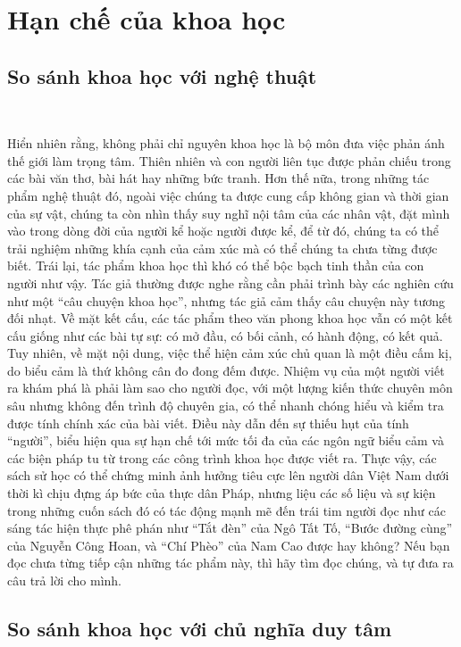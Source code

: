 \section{Hạn chế của khoa học}

\subsection{So sánh khoa học với nghệ thuật}

\

Hiển nhiên rằng, không phải chỉ nguyên khoa học là bộ môn đưa việc phản ánh thế giới làm trọng tâm. Thiên nhiên và con người liên tục được phản chiếu trong các bài văn thơ, bài hát hay những bức tranh. Hơn thế nữa, trong những tác phẩm nghệ thuật đó, ngoài việc chúng ta được cung cấp không gian và thời gian của sự vật, chúng ta còn nhìn thấy suy nghĩ nội tâm của các nhân vật, đặt mình vào trong dòng đời của người kể hoặc người được kể, để từ đó, chúng ta có thể trải nghiệm những khía cạnh của cảm xúc mà có thể chúng ta chưa từng được biết. Trái lại, tác phẩm khoa học thì khó có thể bộc bạch tinh thần của con người như vậy. Tác giả thường được nghe rằng cần phải trình bày các nghiên cứu như một ``câu chuyện khoa học'', nhưng tác giả cảm thấy câu chuyện này tương đối nhạt. Về mặt kết cấu, các tác phẩm theo văn phong khoa học vẫn có một kết cấu giống như các bài tự sự: có mở đầu, có bối cảnh, có hành động, có kết quả. Tuy nhiên, về mặt nội dung, việc thể hiện cảm xúc chủ quan là một điều cấm kị, do biểu cảm là thứ không cân đo đong đếm được. Nhiệm vụ của một người viết ra khám phá là phải làm sao cho người đọc, với một lượng kiến thức chuyên môn sâu nhưng không đến trình độ chuyên gia, có thể nhanh chóng hiểu và kiểm tra được tính chính xác của bài viết. Điều này dẫn đến sự thiếu hụt của tính ``người'', biểu hiện qua sự hạn chế tới mức tối đa của các ngôn ngữ biểu cảm và các biện pháp tu từ trong các công trình khoa học được viết ra. Thực vậy, các sách sử học có thể chứng minh ảnh hưởng tiêu cực lên người dân Việt Nam dưới thời kì chịu đựng áp bức của thực dân Pháp, nhưng liệu các số liệu và sự kiện trong những cuốn sách đó có tác động mạnh mẽ đến trái tim người đọc như các sáng tác hiện thực phê phán như ``Tắt đèn'' của Ngô Tất Tố, ``Bước đường cùng'' của Nguyễn Công Hoan, và ``Chí Phèo'' của Nam Cao được hay không? Nếu bạn đọc chưa từng tiếp cận những tác phẩm này, thì hãy tìm đọc chúng, và tự đưa ra câu trả lời cho mình.

\subsection{So sánh khoa học với chủ nghĩa duy tâm}

